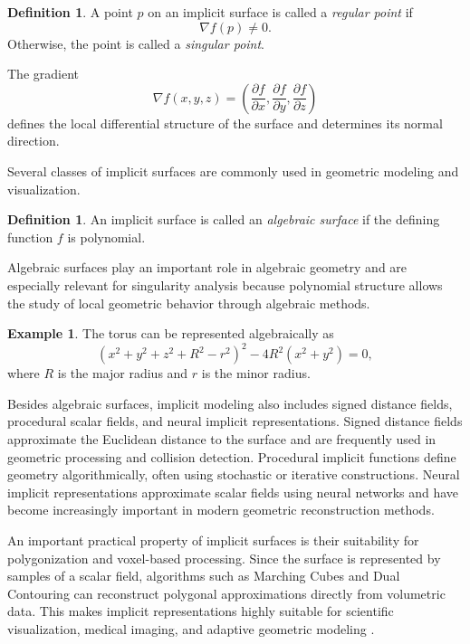 \documentclass[12pt, a4paper, oneside]{book}
\theoremstyle{plain}
\theoremstyle{definition}
\newtheorem{definition}[theorem]{Definition}
\newtheorem{example}[theorem]{Example}
\theoremstyle{remark}
\theoremstyle{definition}
\begin{document}
\begin{definition}
A point $p$ on an implicit surface is called a \emph{regular point} if
\[
\nabla f(p)\neq 0.
\]
Otherwise, the point is called a \emph{singular point}.
\end{definition}

The gradient
\[
\nabla f(x,y,z)=
\left(
\frac{\partial f}{\partial x},
\frac{\partial f}{\partial y},
\frac{\partial f}{\partial z}
\right)
\]
defines the local differential structure of the surface and determines its normal direction.



Several classes of implicit surfaces are commonly used in geometric modeling and visualization.

\begin{definition}
An implicit surface is called an \emph{algebraic surface} if the defining function $f$ is polynomial.
\end{definition}

Algebraic surfaces play an important role in algebraic geometry and are especially relevant for singularity analysis because polynomial structure allows the study of local geometric behavior through algebraic methods.

\begin{example}
The torus can be represented algebraically as
\[
\left(x^2+y^2+z^2+R^2-r^2\right)^2
-4R^2(x^2+y^2)=0,
\]
where $R$ is the major radius and $r$ is the minor radius.
\end{example}

Besides algebraic surfaces, implicit modeling also includes signed distance fields, procedural scalar fields, and neural implicit representations. Signed distance fields approximate the Euclidean distance to the surface and are frequently used in geometric processing and collision detection. Procedural implicit functions define geometry algorithmically, often using stochastic or iterative constructions. Neural implicit representations approximate scalar fields using neural networks and have become increasingly important in modern geometric reconstruction methods.

An important practical property of implicit surfaces is their suitability for polygonization and voxel-based processing. Since the surface is represented by samples of a scalar field, algorithms such as Marching Cubes and Dual Contouring can reconstruct polygonal approximations directly from volumetric data. This makes implicit representations highly suitable for scientific visualization, medical imaging, and adaptive geometric modeling \cite{bloomenthal2000implicit}.
\end{document}
